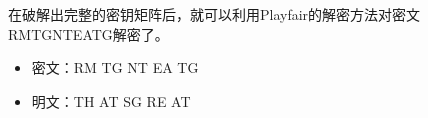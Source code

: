 在破解出完整的密钥矩阵后，就可以利用Playfair的解密方法对密文RMTGNTEATG解密了。

\begin{itemize}
    \item 密文：RM TG NT EA TG
    \item 明文：TH AT SG RE AT
\end{itemize}

\newpage